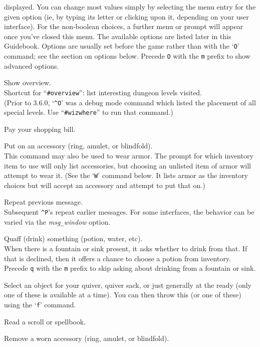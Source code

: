 displayed.  You can change most values simply by selecting the menu
entry for the given option (ie, by typing its letter or clicking upon
it, depending on your user interface).  For the non-boolean choices,
a further menu or prompt will appear once you've closed this menu.
The available options
are listed later in this Guidebook.  Options are usually set before the
game rather than with the `{\tt O}' command; see the section on options below.
Precede {\tt O} with the {\tt m} prefix to show advanced options.
\item[\tb{\^{}O}]
Show overview.\\
Shortcut for ``{\tt \#overview}'':
list interesting dungeon levels visited.\\
(Prior to 3.6.0, `{\tt \^{}O}' was a debug mode command which listed
the placement of all special levels.
Use ``{\tt \#wizwhere}'' to run that command.)
\item[\tb{p}]
Pay your shopping bill.
\item[\tb{P}]
Put on an accessory (ring, amulet, or blindfold).\\
This command may also be used to wear armor.  The prompt for
which inventory item to use will only list accessories, but choosing
an unlisted item of armor will attempt to wear it.
(See the `{\tt W}' command below.  It lists armor as the inventory
choices but will accept an accessory and attempt to put that on.)
\item[\tb{\^{}P}]
Repeat previous message.\\
Subsequent {\tt \^{}P}'s repeat earlier messages.
For some interfaces, the behavior can be varied via the
{\it msg\verb+_+window\/} option.
\item[\tb{q}]
Quaff (drink) something (potion, water, etc).\\
When there is a fountain or sink present, it asks whether to drink
from that.
If that is declined, then it offers a chance to choose a potion from
inventory.
Precede {\tt q} with the {\tt m} prefix to skip asking about
drinking from a fountain or sink.
\item[\tb{Q}]
Select an object for your quiver, quiver sack, or just generally at
the ready (only one of these is available at a time).  You can then throw
this (or one of these) using the `{\tt f}' command.
\item[\tb{r}]
Read a scroll or spellbook.
\item[\tb{R}]
Remove a worn accessory (ring, amulet, or blindfold).\\
